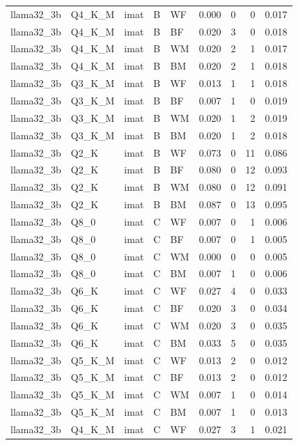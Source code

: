 \begin{tabular}{lllllrrrr}
llama32\_3b & Q4\_K\_M & imat & B & WF & 0.000 & 0 & 0 & 0.017 \\
llama32\_3b & Q4\_K\_M & imat & B & BF & 0.020 & 3 & 0 & 0.018 \\
llama32\_3b & Q4\_K\_M & imat & B & WM & 0.020 & 2 & 1 & 0.017 \\
llama32\_3b & Q4\_K\_M & imat & B & BM & 0.020 & 2 & 1 & 0.018 \\
llama32\_3b & Q3\_K\_M & imat & B & WF & 0.013 & 1 & 1 & 0.018 \\
llama32\_3b & Q3\_K\_M & imat & B & BF & 0.007 & 1 & 0 & 0.019 \\
llama32\_3b & Q3\_K\_M & imat & B & WM & 0.020 & 1 & 2 & 0.019 \\
llama32\_3b & Q3\_K\_M & imat & B & BM & 0.020 & 1 & 2 & 0.018 \\
llama32\_3b & Q2\_K & imat & B & WF & 0.073 & 0 & 11 & 0.086 \\
llama32\_3b & Q2\_K & imat & B & BF & 0.080 & 0 & 12 & 0.093 \\
llama32\_3b & Q2\_K & imat & B & WM & 0.080 & 0 & 12 & 0.091 \\
llama32\_3b & Q2\_K & imat & B & BM & 0.087 & 0 & 13 & 0.095 \\
llama32\_3b & Q8\_0 & imat & C & WF & 0.007 & 0 & 1 & 0.006 \\
llama32\_3b & Q8\_0 & imat & C & BF & 0.007 & 0 & 1 & 0.005 \\
llama32\_3b & Q8\_0 & imat & C & WM & 0.000 & 0 & 0 & 0.005 \\
llama32\_3b & Q8\_0 & imat & C & BM & 0.007 & 1 & 0 & 0.006 \\
llama32\_3b & Q6\_K & imat & C & WF & 0.027 & 4 & 0 & 0.033 \\
llama32\_3b & Q6\_K & imat & C & BF & 0.020 & 3 & 0 & 0.034 \\
llama32\_3b & Q6\_K & imat & C & WM & 0.020 & 3 & 0 & 0.035 \\
llama32\_3b & Q6\_K & imat & C & BM & 0.033 & 5 & 0 & 0.035 \\
llama32\_3b & Q5\_K\_M & imat & C & WF & 0.013 & 2 & 0 & 0.012 \\
llama32\_3b & Q5\_K\_M & imat & C & BF & 0.013 & 2 & 0 & 0.012 \\
llama32\_3b & Q5\_K\_M & imat & C & WM & 0.007 & 1 & 0 & 0.014 \\
llama32\_3b & Q5\_K\_M & imat & C & BM & 0.007 & 1 & 0 & 0.013 \\
llama32\_3b & Q4\_K\_M & imat & C & WF & 0.027 & 3 & 1 & 0.021 \\

\end{tabular}
